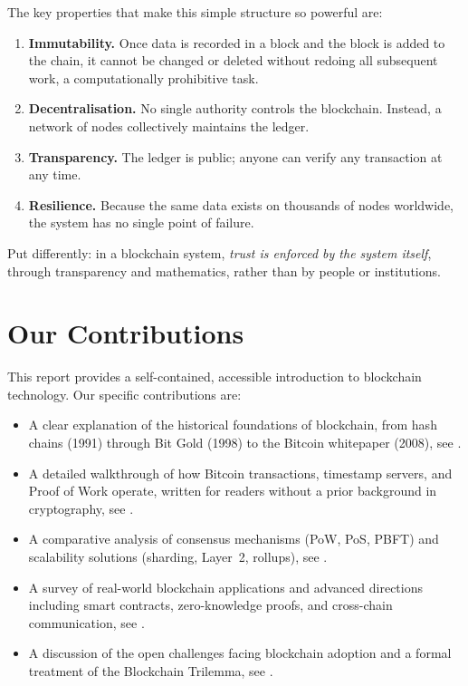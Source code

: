 The key properties that make this simple structure so powerful are:

\begin{enumerate}
    \item \textbf{Immutability.} Once data is recorded in a block and the block is added to the chain, it cannot be changed or deleted without redoing all subsequent work, a computationally prohibitive task.
    \item \textbf{Decentralisation.} No single authority controls the blockchain. Instead, a network of nodes collectively maintains the ledger.
    \item \textbf{Transparency.} The ledger is public; anyone can verify any transaction at any time.
    \item \textbf{Resilience.} Because the same data exists on thousands of nodes worldwide, the system has no single point of failure.
\end{enumerate}

Put differently: in a blockchain system, \emph{trust is enforced by the system itself}, through transparency and mathematics, rather than by people or institutions.

\section{Our Contributions}

This report provides a self-contained, accessible introduction to blockchain technology. Our specific contributions are:

\begin{itemize}
    \item A clear explanation of the historical foundations of blockchain, from hash chains (1991) through Bit Gold (1998) to the Bitcoin whitepaper (2008), see .
    \item A detailed walkthrough of how Bitcoin transactions, timestamp servers, and Proof of Work operate, written for readers without a prior background in cryptography, see .
    \item A comparative analysis of consensus mechanisms (PoW, PoS, PBFT) and scalability solutions (sharding, Layer~2, rollups), see .
    \item A survey of real-world blockchain applications and advanced directions including smart contracts, zero-knowledge proofs, and cross-chain communication, see .
    \item A discussion of the open challenges facing blockchain adoption and a formal treatment of the Blockchain Trilemma, see .
\end{itemize}


